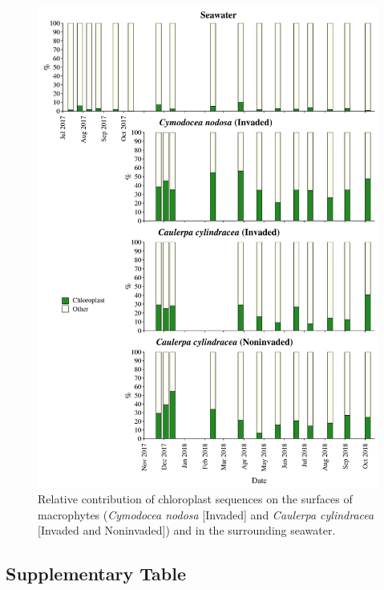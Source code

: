 \documentclass[12pt,]{article}
\begin{document}
\begin{figure}[H]

{\centering \includegraphics[width=0.85\linewidth]{../results/figures/chloroplast_bar_plot} 

}

\caption{Relative contribution of chloroplast sequences on the surfaces of macrophytes (\textit{Cymodocea nodosa} [Invaded] and \textit{Caulerpa cylindracea} [Invaded and Noninvaded]) and in the surrounding seawater.\label{chloroplast}}\label{fig:unnamed-chunk-3}
\end{figure}

\hypertarget{supplementary-table}{%
\subsection{Supplementary Table}\label{supplementary-table}}

\begingroup\fontsize{9}{11}\selectfont
\end{document}
